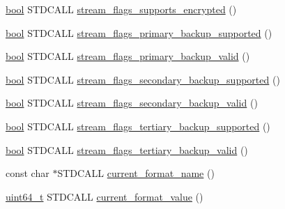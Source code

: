 \begin{DoxyCompactItemize}
\item 
\hyperlink{avb__gptp_8h_af6a258d8f3ee5206d682d799316314b1}{bool} S\+T\+D\+C\+A\+LL \hyperlink{classavdecc__lib_1_1stream__input__descriptor__response__imp_afc7e2cb300362fedc704d6f67ef30473}{stream\+\_\+flags\+\_\+supports\+\_\+encrypted} ()
\item 
\hyperlink{avb__gptp_8h_af6a258d8f3ee5206d682d799316314b1}{bool} S\+T\+D\+C\+A\+LL \hyperlink{classavdecc__lib_1_1stream__input__descriptor__response__imp_ae370f065c1e15a8a90f01e5cceb1d700}{stream\+\_\+flags\+\_\+primary\+\_\+backup\+\_\+supported} ()
\item 
\hyperlink{avb__gptp_8h_af6a258d8f3ee5206d682d799316314b1}{bool} S\+T\+D\+C\+A\+LL \hyperlink{classavdecc__lib_1_1stream__input__descriptor__response__imp_a2ac6e8f610d5624630dbad9d23501ca4}{stream\+\_\+flags\+\_\+primary\+\_\+backup\+\_\+valid} ()
\item 
\hyperlink{avb__gptp_8h_af6a258d8f3ee5206d682d799316314b1}{bool} S\+T\+D\+C\+A\+LL \hyperlink{classavdecc__lib_1_1stream__input__descriptor__response__imp_a82c7349d93a643ea02c489b6a78f32bc}{stream\+\_\+flags\+\_\+secondary\+\_\+backup\+\_\+supported} ()
\item 
\hyperlink{avb__gptp_8h_af6a258d8f3ee5206d682d799316314b1}{bool} S\+T\+D\+C\+A\+LL \hyperlink{classavdecc__lib_1_1stream__input__descriptor__response__imp_a1e029ab0cb65f681db424703165495f7}{stream\+\_\+flags\+\_\+secondary\+\_\+backup\+\_\+valid} ()
\item 
\hyperlink{avb__gptp_8h_af6a258d8f3ee5206d682d799316314b1}{bool} S\+T\+D\+C\+A\+LL \hyperlink{classavdecc__lib_1_1stream__input__descriptor__response__imp_ab5b0e24f5b6742e9e5a0dd301301de8f}{stream\+\_\+flags\+\_\+tertiary\+\_\+backup\+\_\+supported} ()
\item 
\hyperlink{avb__gptp_8h_af6a258d8f3ee5206d682d799316314b1}{bool} S\+T\+D\+C\+A\+LL \hyperlink{classavdecc__lib_1_1stream__input__descriptor__response__imp_a41e641d2e5f1e8d42146b7563fd48c5c}{stream\+\_\+flags\+\_\+tertiary\+\_\+backup\+\_\+valid} ()
\item 
const char $\ast$S\+T\+D\+C\+A\+LL \hyperlink{classavdecc__lib_1_1stream__input__descriptor__response__imp_a41ea895a8803b5e19ec9ebf1e6cc3a61}{current\+\_\+format\+\_\+name} ()
\item 
\hyperlink{parse_8c_aec6fcb673ff035718c238c8c9d544c47}{uint64\+\_\+t} S\+T\+D\+C\+A\+LL \hyperlink{classavdecc__lib_1_1stream__input__descriptor__response__imp_aab36b0610e422318dced082cf17d8d16}{current\+\_\+format\+\_\+value} ()
\item 

\end{DoxyCompactItemize}
